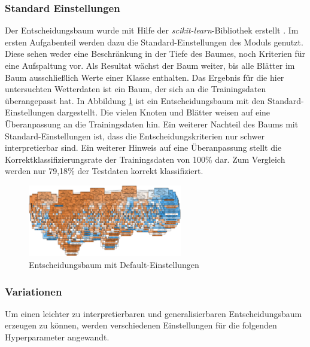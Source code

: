 \subsubsection{Standard Einstellungen}
Der Entscheidungsbaum wurde mit Hilfe der \emph{scikit-learn}-Bibliothek erstellt \cite{scikit-learn}. Im ersten Aufgabenteil werden dazu die Standard-Einstellungen des Moduls genutzt. Diese sehen weder eine Beschränkung in der Tiefe des Baumes, noch Kriterien für eine Aufspaltung vor. Als Resultat wächst der Baum weiter, bis alle Blätter im Baum ausschließlich Werte einer Klasse enthalten. Das Ergebnis für die hier untersuchten Wetterdaten ist ein Baum, der sich an die Trainingsdaten überangepasst hat. In Abbildung \ref{fig:treedefault} ist ein Entscheidungsbaum mit den Standard-Einstellungen dargestellt. Die vielen Knoten und Blätter weisen auf eine Überanpassung an die Trainingsdaten hin. Ein weiterer Nachteil des Baums mit Standard-Einstellungen ist, dass die Entscheidungskriterien nur schwer interpretierbar sind. Ein weiterer Hinweis auf eine Überanpassung stellt die Korrektklassifizierungsrate der Trainingsdaten von 100\% dar. Zum Vergleich werden nur 79,18\% der Testdaten korrekt klassifiziert.

\begin{figure}[h]
	\centering
	\includegraphics[width = 0.6\textwidth]{Bilder/treedefault}
	\caption{Entscheidungsbaum mit Default-Einstellungen}
	\label{fig:treedefault}
\end{figure}


\subsubsection{Variationen}
Um einen leichter zu interpretierbaren und generalisierbaren Entscheidungsbaum erzeugen zu können, werden verschiedenen Einstellungen für die folgenden Hyperparameter angewandt. 


